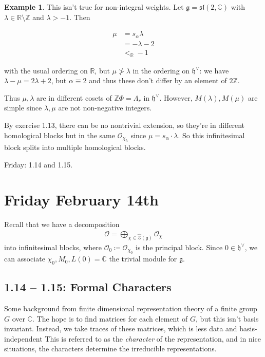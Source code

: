 \documentclass[11pt]{scrartcl}
\theoremstyle{definition}
\theoremstyle{theorem}
\theoremstyle{proof}
\theoremstyle{definition}
\theoremstyle{break}
\newtheorem{example}{Example}[section]
\theoremstyle{problem}
\newcommand{\CC}[0]{{\mathbb{C}}}
\newcommand{\RR}[0]{{\mathbb{R}}}
\newcommand{\ZZ}[0]{{\mathbb{Z}}}
\newcommand{\definedas}[0]{\coloneqq}
\newcommand{\dual}[0]{^\vee}
\newcommand{\lieg}[0]{{\mathfrak{g}}}
\newcommand{\lieh}[0]{{\mathfrak{h}}}
\newcommand{\liesl}[0]{{\mathfrak{sl}}}
\newcommand{\OO}[0]{{\mathcal{O}}}
\newcommand{\mcz}[0]{{\mathcal{Z}}}
\renewcommand{\hat}[1]{\widehat{#1}}
\begin{document}
\begin{example}

This isn't true for non-integral weights. Let \(\lieg = \liesl(2, \CC)\)
with \(\lambda \in \RR \setminus \ZZ\) and \(\lambda > -1\). Then

\begin{align*}
\mu 
&= s_\alpha \lambda  \\
&= -\lambda - 2  \\
&<_{\RR} -1
\end{align*}

with the usual ordering on \(\RR\), but \(\mu \not > \lambda\) in the
ordering on \(\lieh\dual\): we have \(\lambda - \mu = 2\lambda + 2\),
but \(\alpha \equiv 2\) and thus these don't differ by an element of
\(2\ZZ\).

Thus \(\mu, \lambda\) are in different cosets of \(\ZZ\Phi = \Lambda_r\)
in \(\lieh\dual\). However, \(M(\lambda), M(\mu)\) are simple since
\(\lambda, \mu\) are not non-negative integers.

By exercise 1.13, there can be no nontrivial extension, so they're in
different homological blocks but in the same \(\OO_{\chi_\lambda}\)
since \(\mu = s_\alpha \cdot \lambda\). So this infinitesimal block
splits into multiple homological blocks.\end{example}

Friday: 1.14 and 1.15.

\hypertarget{friday-february-14th}{%
\section{Friday February 14th}\label{friday-february-14th}}

Recall that we have a decomposition
\begin{align*}\OO = \bigoplus_{\chi \in \hat\mcz(\lieg)} \OO_\chi\end{align*}
into infinitesimal blocks, where \(\OO_0 \definedas \OO_{\chi_0}\) is
the principal block. Since \(0\in\lieh\dual\), we can associate
\(\chi_0, M_0, L(0) = \CC\) the trivial module for \(\lieg\).

\hypertarget{formal-characters}{%
\subsection{1.14 -- 1.15: Formal Characters}\label{formal-characters}}

Some background from finite dimensional representation theory of a
finite group \(G\) over \(\CC\). The hope is to find matrices for each
element of \(G\), but this isn't basis invariant. Instead, we take
traces of these matrices, which is less data and basis-independent This
is referred to as the \emph{character} of the representation, and in
nice situations, the characters determine the irreducible
representations.
\end{document}
